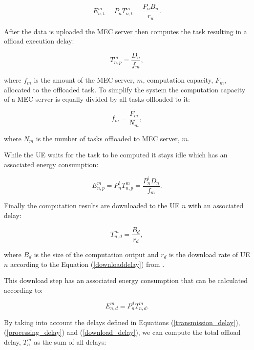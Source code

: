 \begin{equation} \label{transmission_energy}
    E_{n,t}^m = P_n T_{n,t}^m = \frac{P_n B_n}{r_u} .
\end{equation}

After the data is uploaded the \acrshort{MEC} server then computes the task resulting in a offload execution delay:

\begin{equation} \label{processing_delay}
    T_{n,p}^m = \frac{D_n}{f_m} ,
\end{equation}

where $f_m$ is the amount of the \acrshort{MEC} server, $m$, computation capacity, $F_m$, allocated to the offloaded task. To simplify the system the computation capacity of a \acrshort{MEC} server is equally divided by all tasks offloaded to it:

\begin{equation}
    f_m = \frac{F_m}{N_m},
\end{equation}

where $N_m$ is the number of tasks offloaded to \acrshort{MEC} server, $m$.

While the \acrshort{UE} waits for the task to be computed it stays idle which has an associated energy consumption:

\begin{equation} \label{idle_energy}
    E_{n,p}^m = P_n^i T_{n,p}^m = \frac{P_n^i D_n}{f_m}.
\end{equation}

Finally the computation results are downloaded to the \acrshort{UE} $n$ with an associated delay:

\begin{equation} \label{download_delay}
    T_{n, d}^m = \frac{B_d}{r_d},
\end{equation}

where $B_d$ is the size of the computation output and $r_d$ is the download rate of \acrshort{UE} $n$ according to the Equation (\ref{downloaddelay}) from \cite{taskclass1}.

This download step has an associated energy consumption that can be calculated according to:

\begin{equation} \label{download_energy}
    E_{n, d}^m = P_n^d T_{n, d}^m .
\end{equation}

By taking into account the delays defined in Equations (\ref{transmission_delay}), (\ref{processing_delay}) and (\ref{download_delay}), we can compute the total offload delay, $T_n^m$ as the sum of all delays:

